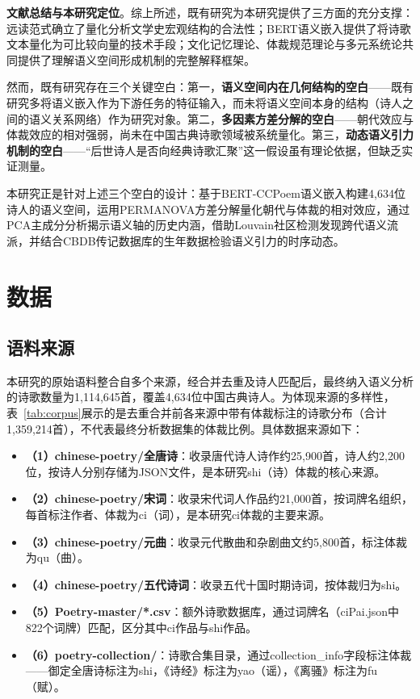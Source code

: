 \documentclass[12pt,a4paper]{article}
\numberwithin{equation}{section}
\begin{document}
\textbf{文献总结与本研究定位}。综上所述，既有研究为本研究提供了三方面的充分支撑：远读范式确立了量化分析文学史宏观结构的合法性；BERT语义嵌入提供了将诗歌文本量化为可比较向量的技术手段；文化记忆理论、体裁规范理论与多元系统论共同提供了理解语义空间形成机制的完整解释框架。

然而，既有研究存在三个关键空白：第一，\textbf{语义空间内在几何结构的空白}——既有研究多将语义嵌入作为下游任务的特征输入，而未将语义空间本身的结构（诗人之间的语义关系网络）作为研究对象。第二，\textbf{多因素方差分解的空白}——朝代效应与体裁效应的相对强弱，尚未在中国古典诗歌领域被系统量化。第三，\textbf{动态语义引力机制的空白}——“后世诗人是否向经典诗歌汇聚”这一假设虽有理论依据，但缺乏实证测量。

本研究正是针对上述三个空白的设计：基于BERT-CCPoem语义嵌入构建4,634位诗人的语义空间，运用PERMANOVA方差分解量化朝代与体裁的相对效应，通过PCA主成分分析揭示语义轴的历史内涵，借助Louvain社区检测发现跨代语义流派，并结合CBDB传记数据库的生年数据检验语义引力的时序动态。

\section{数据}

\subsection{语料来源}

本研究的原始语料整合自多个来源，经合并去重及诗人匹配后，最终纳入语义分析的诗歌数量为1,114,645首，覆盖4,634位中国古典诗人。为体现来源的多样性，表~\ref{tab:corpus}展示的是去重合并前各来源中带有体裁标注的诗歌分布（合计1,359,214首），不代表最终分析数据集的体裁比例。具体数据来源如下：

\begin{itemize}
  \item \textbf{（1）chinese-poetry/全唐诗}：收录唐代诗人诗作约25,900首，诗人约2,200位，按诗人分别存储为JSON文件，是本研究shi（诗）体裁的核心来源。
  \item \textbf{（2）chinese-poetry/宋词}：收录宋代词人作品约21,000首，按词牌名组织，每首标注作者、体裁为ci（词），是本研究ci体裁的主要来源。
  \item \textbf{（3）chinese-poetry/元曲}：收录元代散曲和杂剧曲文约5,800首，标注体裁为qu（曲）。
  \item \textbf{（4）chinese-poetry/五代诗词}：收录五代十国时期诗词，按体裁归为shi。
  \item \textbf{（5）Poetry-master/*.csv}：额外诗歌数据库，通过词牌名（ciPai.json中822个词牌）匹配，区分其中ci作品与shi作品。
  \item \textbf{（6）poetry-collection/}：诗歌合集目录，通过collection\_info字段标注体裁——御定全唐诗标注为shi，《诗经》标注为yao（谣），《离骚》标注为fu（赋）。
\end{itemize}
\end{document}
